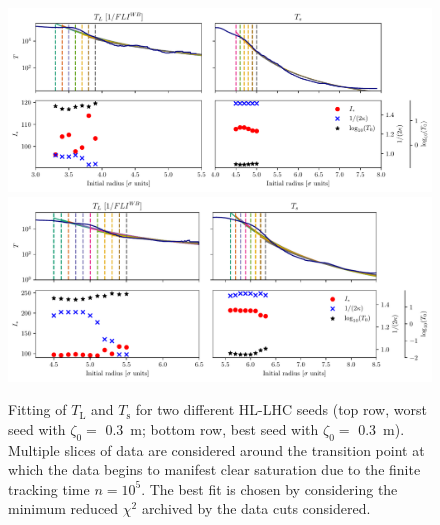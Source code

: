 \begin{figure}
    \centering
    \includegraphics[width=1\textwidth]{6_lhc_dynamic_indicators/figs/fit_l_time_bad.pdf}
    \includegraphics[width=1\textwidth]{6_lhc_dynamic_indicators/figs/fit_l_time_best.pdf}
    \caption{Fitting of $T_\mathrm{L}$ and $T_\mathrm{s}$ for two different HL-LHC seeds (top row, worst seed with $\zeta_0=$ \SI{0.3}{\meter}; bottom row, best seed with $\zeta_0=$ \SI{0.3}{\meter}). Multiple slices of data are considered around the transition point at which the data begins to manifest clear saturation due to the finite tracking time $n=10^5$. The best fit is chosen by considering the minimum reduced $\chi^2$ archived by the data cuts considered.}
    \label{fig:the_lyap_fit}
\end{figure}

